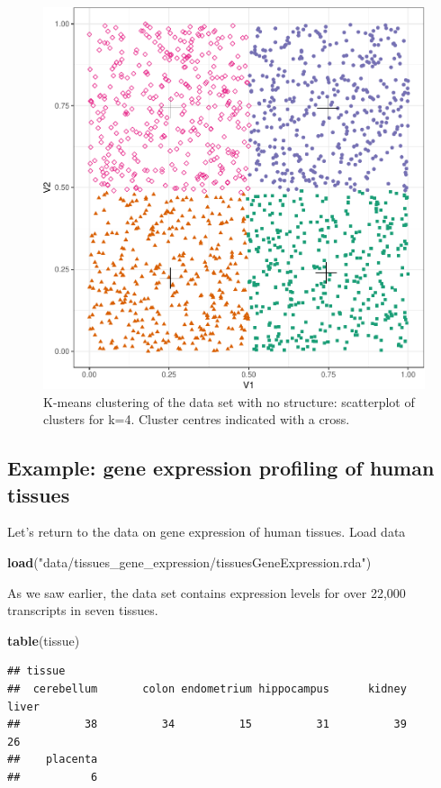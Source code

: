 \documentclass[]{book}
\newenvironment{Shaded}{\begin{snugshade}}{\end{snugshade}}
\newcommand{\KeywordTok}[1]{\textcolor[rgb]{0.13,0.29,0.53}{\textbf{{#1}}}}
\newcommand{\StringTok}[1]{\textcolor[rgb]{0.31,0.60,0.02}{{#1}}}
\newcommand{\NormalTok}[1]{{#1}}
\theoremstyle{definition}
\theoremstyle{definition}
\theoremstyle{definition}
\theoremstyle{remark}
\begin{document}
\begin{figure}

{\centering \includegraphics[width=0.5\linewidth]{09-clustering_files/figure-latex/noStructureScatter-1} 

}

\caption{K-means clustering of the data set with no structure: scatterplot of clusters for k=4. Cluster centres indicated with a cross.}\label{fig:noStructureScatter}
\end{figure}

\subsection{Example: gene expression profiling of human
tissues}\label{example-gene-expression-profiling-of-human-tissues-1}

Let's return to the data on gene expression of human tissues. Load data

\begin{Shaded}
\begin{Highlighting}[]
\KeywordTok{load}\NormalTok{(}\StringTok{"data/tissues_gene_expression/tissuesGeneExpression.rda"}\NormalTok{)}
\end{Highlighting}
\end{Shaded}

As we saw earlier, the data set contains expression levels for over
22,000 transcripts in seven tissues.

\begin{Shaded}
\begin{Highlighting}[]
\KeywordTok{table}\NormalTok{(tissue)}
\end{Highlighting}
\end{Shaded}

\begin{verbatim}
## tissue
##  cerebellum       colon endometrium hippocampus      kidney       liver 
##          38          34          15          31          39          26 
##    placenta 
##           6
\end{verbatim}
\end{document}
